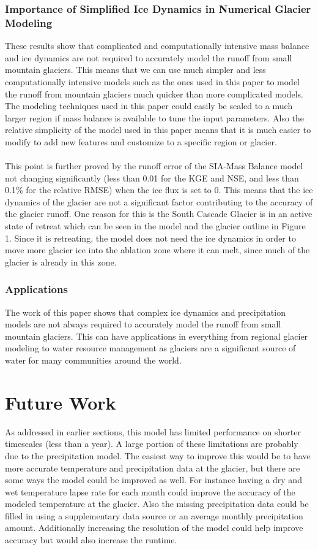 \documentclass{article}
\begin{document}
\subsubsection{Importance of Simplified Ice Dynamics in Numerical Glacier Modeling}
These results show that complicated and computationally intensive mass balance and ice dynamics are not required to accurately model the 
runoff from small mountain glaciers. This means that we can use much simpler and less computationally intensive models such as the ones used 
in this paper to model the runoff from mountain glaciers much quicker than more complicated models. The modeling techniques used in this paper could 
easily be scaled to a much larger region if mass balance is available to tune the input parameters. Also the relative simplicity of the model used in 
this paper means that it is much easier to modify to add new features and customize to a specific region or glacier.
\paragraph{}
This point is further proved by the runoff error of the SIA-Mass Balance model not changing significantly (less than 0.01 for the KGE and NSE, and less than 
0.1\% for the relative RMSE) when 
the ice flux is set to 0. This means that the ice dynamics of the glacier are not a significant factor contributing to the accuracy of the glacier runoff. One reason 
for this is the South Cascade Glacier is in an active state of retreat which can be seen in the model and the 
glacier outline in Figure 1. Since it is retreating, the model does not need the ice dynamics in order to move more glacier ice into the ablation zone 
where it can melt, since much of the glacier is already in this zone.
\subsubsection{Applications}
The work of this paper shows that complex ice dynamics and precipitation models are not always required to accurately model the runoff from small mountain glaciers. This 
can have applications in everything from regional glacier modeling to water resource management as glaciers are a significant source of water 
for many communities around the world. 
\section{Future Work}
As addressed in earlier sections, this model has limited performance on shorter timescales (less than a year). A large portion of these limitations 
are probably due to the precipitation model. The easiest way to improve this would be to have more accurate temperature and precipitation data at the glacier, but 
there are some ways the model could be improved as well. For instance having a dry and wet temperature lapse rate for each month could improve the accuracy of the modeled 
temperature at the glacier. Also the missing precipitation data could be filled in using a supplementary data source or an average monthly precipitation amount.
Additionally increasing the resolution of the model could help improve accuracy but would also increase the runtime.
\end{document}
